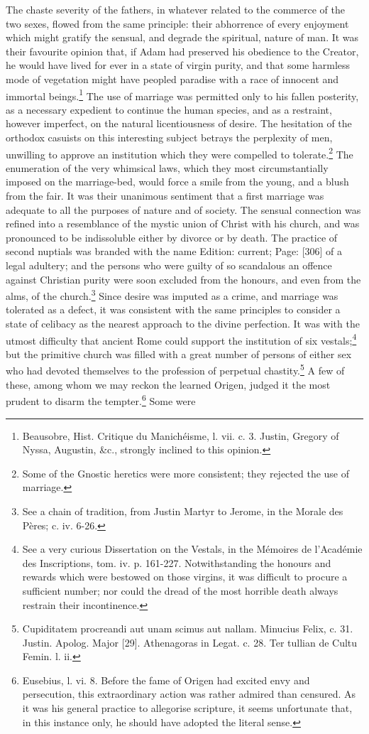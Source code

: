 The chaste severity of the fathers, in whatever related to the commerce of the two sexes, flowed from the same principle: their abhorrence of every enjoyment which might gratify the sensual, and degrade the spiritual, nature of man. It was their favourite opinion that, if Adam had preserved his obedience to the Creator, he would have lived for ever in a state of virgin purity, and that some harmless mode of vegetation might have peopled paradise with a race of innocent and immortal beings.\footnote{Beausobre, Hist. Critique du Manichéisme, l. vii. c. 3. Justin, Gregory of Nyssa, Augustin, \&c., strongly inclined to this opinion.} The use of marriage was permitted only to his fallen posterity, as a necessary expedient to continue the human species, and as a restraint, however imperfect, on the natural licentiousness of desire. The hesitation of the orthodox casuists on this interesting subject betrays the perplexity of men, unwilling to approve an institution which they were compelled to tolerate.\footnote{Some of the Gnostic heretics were more consistent; they rejected the use of marriage.} The enumeration of the very whimsical laws, which they most circumstantially imposed on the marriage-bed, would force a smile from the young, and a blush from the fair. It was their unanimous sentiment that a first marriage was adequate to all the purposes of nature and of society. The sensual connection was refined into a resemblance of the mystic union of Christ with his church, and was pronounced to be indissoluble either by divorce or by death. The practice of second nuptials was branded with the name Edition: current; Page: [306] of a legal adultery; and the persons who were guilty of so scandalous an offence against Christian purity were soon excluded from the honours, and even from the alms, of the church.\footnote{See a chain of tradition, from Justin Martyr to Jerome, in the Morale des Pères; c. iv. 6-26.} Since desire was imputed as a crime, and marriage was tolerated as a defect, it was consistent with the same principles to consider a state of celibacy as the nearest approach to the divine perfection. It was with the utmost difficulty that ancient Rome could support the institution of six vestals;\footnote{See a very curious Dissertation on the Vestals, in the Mémoires de l\texthebrew{}’Académie des Inscriptions, tom. iv. p. 161-227. Notwithstanding the honours and rewards which were bestowed on those virgins, it was difficult to procure a sufficient number; nor could the dread of the most horrible death always restrain their incontinence.} but the primitive church was filled with a great number of persons of either sex who had devoted themselves to the profession of perpetual chastity.\footnote{Cupiditatem procreandi aut unam scimus aut nallam. Minucius Felix, c. 31. Justin. Apolog. Major [29]. Athenagoras in Legat. c. 28. Ter tullian de Cultu Femin. l. ii.} A few of these, among whom we may reckon the learned Origen, judged it the most prudent to disarm the tempter.\footnote{Eusebius, l. vi. 8. Before the fame of Origen had excited envy and persecution, this extraordinary action was rather admired than censured. As it was his general practice to allegorise scripture, it seems unfortunate that, in this instance only, he should have adopted the literal sense.} Some were 